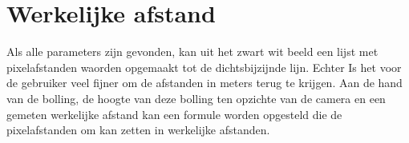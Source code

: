 \documentclass[a4paper]{article}
\begin{document}
\section{Werkelijke afstand}
Als alle parameters zijn gevonden, kan uit het zwart wit beeld een lijst met pixelafstanden waorden opgemaakt tot de dichtsbijzijnde lijn. Echter Is het voor de gebruiker veel fijner om de afstanden in meters terug te krijgen. Aan de hand van de bolling, de hoogte van deze bolling ten opzichte van de camera en een gemeten werkelijke afstand kan een formule worden opgesteld die de pixelafstanden om kan zetten in werkelijke afstanden. 
\end{document}
